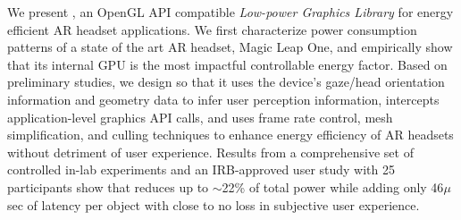 %
%
%
%
%
We present {\myit}, an OpenGL API compatible \emph{Low-power Graphics Library}
for energy efficient AR headset applications.
%
We first characterize power consumption patterns of a state of the art 
AR headset, Magic Leap One, and empirically show that its internal GPU is 
the most impactful controllable energy factor.
%
Based on preliminary studies, we design {\myit} so that it uses the 
device's gaze/head orientation information
and geometry data to infer user perception information, 
intercepts application-level graphics API calls, 
and uses frame rate control, mesh simplification, and culling techniques
to enhance energy efficiency of AR headsets without detriment of user experience.
%
%
%
Results from a comprehensive set of controlled in-lab experiments and an 
IRB-approved user study with 25 participants
%
show that {\myit} reduces up to $\sim$22\% of total power while adding only 46$\mu$sec of latency per object with close to no loss in subjective user 
experience.
%
%



